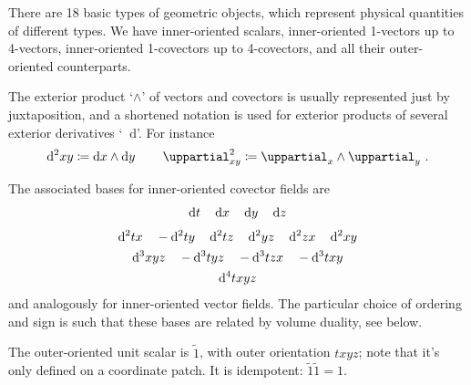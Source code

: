 \documentclass[\ifafour a4paper,12pt,\else a5paper,10pt,\fi%
onecolumn,oneside,article,%
british%
]{memoir}
\theoremstyle{remark}
\theoremstyle{innote}
\newcommand*{\de}{\mathop{}\!\uppartial}%
\newcommand*{\di}{\mathop{}\!\mathrm{d}}%
\newcommand*{\defd}{\coloneqq}
\renewcommand*{\|}[1][]{\nonscript\:#1\vert\nonscript\:\mathopen{}}
\newcommand*{\si}[1]{\di{#1}}
\newcommand*{\ssi}[1]{\di^{2}{#1}}
\newcommand*{\sssi}[1]{\di^{3}{#1}}
\newcommand*{\ssssi}[1]{\di^{4}{#1}}
\newcommand*{\tw}[1]{\tilde{#1}}
\begin{document}
There are 18 basic types of geometric objects, which represent physical quantities of different types. We have inner-oriented scalars, inner-oriented 1-vectors up to 4-vectors, inner-oriented 1-covectors up to 4-covectors, and all their outer-oriented counterparts.

The exterior product \enquote*{$\land$} of vectors and covectors is usually represented just by juxtaposition, and a shortened notation is used for exterior products of several exterior derivatives \enquote*{$\di$}. For instance
\begin{equation}
  \label{eq:notation_dwedge}
  \di^{2}xy \defd \di x \land \di y
  \qquad
  \de^{2}_{xy} \defd \de_{x} \land \de_{y} \ .
\end{equation}

The associated bases for inner-oriented covector fields are
\begin{gather}
  \label{eq:basis_1vec}
  \si{t}\quad
  \si{x}\quad
  \si{y}\quad
  \si{z}
  \\[\jot]
  \label{eq:basis_2vec}
  \ssi{tx}\quad
  -\ssi{ty}\quad
  \ssi{tz}\quad
  \ssi{yz}\quad
  \ssi{zx}\quad
  \ssi{xy}
  \\
  \label{eq:basis_3vec}
  \sssi{xyz}\quad
  -\sssi{tyz}\quad
  -\sssi{tzx}\quad
  -\sssi{txy}
  \\
  \label{eq:basis_4vec}
  \ssssi{txyz}
\end{gather}
and analogously for inner-oriented vector fields. The particular choice of ordering and sign is such that these bases are related by volume duality, see below.

The outer-oriented unit scalar is $\tw{1}$, with outer orientation $txyz$; note that it's only defined on a coordinate patch. It is idempotent: $\tw{1}\tw{1} =1$.
\end{document}
